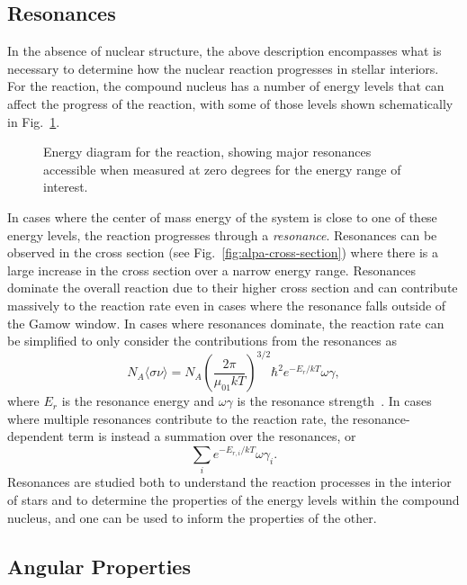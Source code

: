 \subsection{Resonances}

In the absence of nuclear structure, the above description encompasses what is
necessary to determine how the nuclear reaction progresses in stellar
interiors. For the \alpa{} reaction, the compound nucleus  has a
number of energy levels that can affect the progress of the reaction, with
some of those levels shown schematically in Fig.~\ref{fig:alpa}.

\begin{figure}[t]
    \begin{center}
        \label{fig:alpa}
        \caption[Energy diagram for the \alpa{} reaction]{Energy diagram for
            the \alpa{} reaction, showing major resonances accessible when
            measured at zero degrees for the energy range of interest.}
    \end{center}
\end{figure}

In cases where the center of mass energy of the system is close to one of these
energy levels, the reaction progresses through a \emph{resonance}. Resonances
can be observed in the cross section (see Fig.~\ref{fig:alpa-cross-section})
where there is a large increase in the cross section over a narrow energy
range. Resonances dominate the overall reaction due to their higher cross
section and can contribute massively to the reaction rate even in cases where
the resonance falls outside of the Gamow window. In cases where resonances
dominate, the reaction rate can be simplified to only consider the
contributions from the resonances as
\[
    N_A\langle\sigma\nu\rangle = N_A\left(\frac{2\pi}{\mu_{01}kT}\right)^{3/2}
        \hbar^2e^{-E_r/kT}\omega\gamma,
\]
where $E_r$ is the resonance energy and $\omega\gamma$ is the resonance
strength~\cite{Iliadis}. In cases where multiple resonances contribute to the
reaction rate, the resonance-dependent term is instead a summation over the
resonances, or
\[
    \sum_i e^{-E_{r,i}/kT}\omega\gamma_i.
\]
Resonances are studied both to understand the reaction processes in the
interior of stars and to determine the properties of the energy levels within
the compound nucleus, and one can be used to inform the properties of the
other.

\subsection{Angular Properties}

